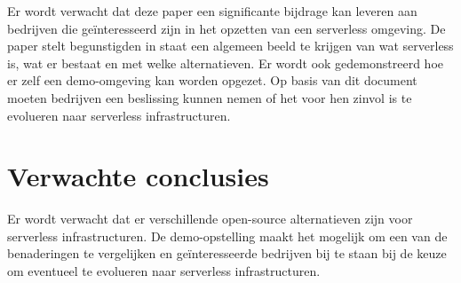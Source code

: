Er wordt verwacht dat deze paper een significante bijdrage kan leveren aan bedrijven die geïnteresseerd zijn in het opzetten van een serverless omgeving. De paper stelt begunstigden in staat een algemeen beeld te krijgen van wat serverless is, wat er bestaat en met welke alternatieven. Er wordt ook gedemonstreerd hoe er zelf een demo-omgeving kan worden opgezet. Op basis van dit document moeten bedrijven een beslissing kunnen nemen of het voor hen zinvol is te evolueren naar serverless infrastructuren.


\section{Verwachte conclusies}
\label{sec:verwachte_conclusies}

Er wordt verwacht dat er verschillende open-source alternatieven zijn voor serverless infrastructuren. De demo-opstelling maakt het mogelijk om een van de benaderingen te vergelijken en geïnteresseerde bedrijven bij te staan bij de keuze om eventueel te evolueren naar serverless infrastructuren.

